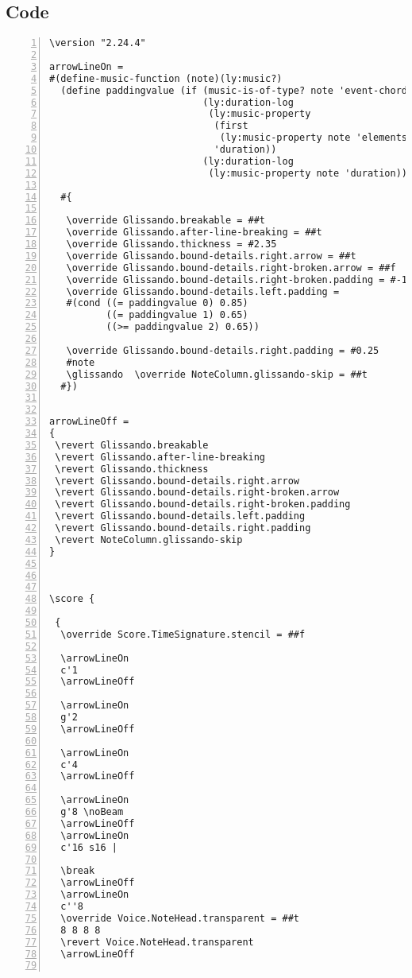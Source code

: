 \subsection{Code}
\begin{Verbatim}[numbers=left,xleftmargin=5mm]
\version "2.24.4"

arrowLineOn =
#(define-music-function (note)(ly:music?)
  (define paddingvalue (if (music-is-of-type? note 'event-chord)
                           (ly:duration-log
                            (ly:music-property
                             (first
                              (ly:music-property note 'elements))
                             'duration))
                           (ly:duration-log
                            (ly:music-property note 'duration))))

  #{

   \override Glissando.breakable = ##t
   \override Glissando.after-line-breaking = ##t
   \override Glissando.thickness = #2.35
   \override Glissando.bound-details.right.arrow = ##t
   \override Glissando.bound-details.right-broken.arrow = ##f
   \override Glissando.bound-details.right-broken.padding = #-1
   \override Glissando.bound-details.left.padding =
   #(cond ((= paddingvalue 0) 0.85)
          ((= paddingvalue 1) 0.65)
          ((>= paddingvalue 2) 0.65))

   \override Glissando.bound-details.right.padding = #0.25
   #note
   \glissando  \override NoteColumn.glissando-skip = ##t
  #})


arrowLineOff =
{
 \revert Glissando.breakable
 \revert Glissando.after-line-breaking
 \revert Glissando.thickness
 \revert Glissando.bound-details.right.arrow
 \revert Glissando.bound-details.right-broken.arrow
 \revert Glissando.bound-details.right-broken.padding
 \revert Glissando.bound-details.left.padding
 \revert Glissando.bound-details.right.padding
 \revert NoteColumn.glissando-skip
}



\score {

 {
  \override Score.TimeSignature.stencil = ##f

  \arrowLineOn
  c'1
  \arrowLineOff

  \arrowLineOn
  g'2
  \arrowLineOff

  \arrowLineOn
  c'4
  \arrowLineOff

  \arrowLineOn
  g'8 \noBeam
  \arrowLineOff
  \arrowLineOn
  c'16 s16 |

  \break
  \arrowLineOff
  \arrowLineOn
  c''8
  \override Voice.NoteHead.transparent = ##t
  8 8 8 8
  \revert Voice.NoteHead.transparent
  \arrowLineOff


\end{Verbatim}
